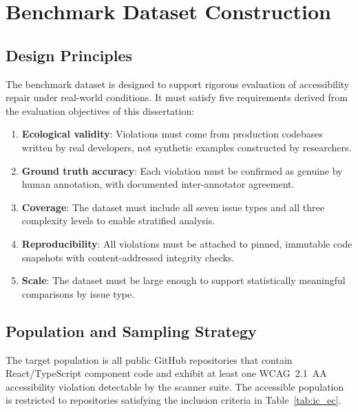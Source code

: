 \section{Benchmark Dataset Construction}
\label{sec:dataset}

\subsection{Design Principles}

The benchmark dataset is designed to support rigorous evaluation of
accessibility repair under real-world conditions.  It must satisfy five
requirements derived from the evaluation objectives of this dissertation:

\begin{enumerate}
  \item \textbf{Ecological validity}: Violations must come from production
    codebases written by real developers, not synthetic examples constructed
    by researchers.
  \item \textbf{Ground truth accuracy}: Each violation must be confirmed as
    genuine by human annotation, with documented inter-annotator agreement.
  \item \textbf{Coverage}: The dataset must include all seven issue types and
    all three complexity levels to enable stratified analysis.
  \item \textbf{Reproducibility}: All violations must be attached to pinned,
    immutable code snapshots with content-addressed integrity checks.
  \item \textbf{Scale}: The dataset must be large enough to support
    statistically meaningful comparisons by issue type.
\end{enumerate}

\subsection{Population and Sampling Strategy}

The target population is all public GitHub repositories that contain
React/TypeScript component code and exhibit at least one WCAG~2.1~AA
accessibility violation detectable by the scanner suite.  The accessible
population is restricted to repositories satisfying the inclusion criteria in
Table~\ref{tab:ic_ec}.

